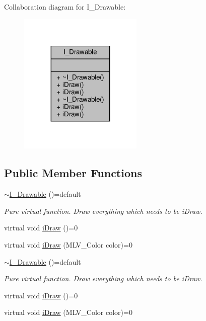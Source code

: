 Collaboration diagram for I\+\_\+\+Drawable\+:\nopagebreak
\begin{figure}[H]
\begin{center}
\leavevmode
\includegraphics[width=167pt]{classI__Drawable__coll__graph}
\end{center}
\end{figure}
\subsection*{Public Member Functions}
\begin{DoxyCompactItemize}
\item 
\hyperlink{classI__Drawable_a80bfc9f76ccdded97cbcf446d4ace774}{$\sim$\+I\+\_\+\+Drawable} ()=default
\begin{DoxyCompactList}\small\item\em Pure virtual function. Draw everything which needs to be i\+Draw. \end{DoxyCompactList}\item 
virtual void \hyperlink{classI__Drawable_ae24c65000977a805f52ce032321cd86f}{i\+Draw} ()=0
\item 
virtual void \hyperlink{classI__Drawable_a25f6474325614c451a91f019e5fe8010}{i\+Draw} (M\+L\+V\+\_\+\+Color color)=0
\item 
\hyperlink{classI__Drawable_a80bfc9f76ccdded97cbcf446d4ace774}{$\sim$\+I\+\_\+\+Drawable} ()=default
\begin{DoxyCompactList}\small\item\em Pure virtual function. Draw everything which needs to be i\+Draw. \end{DoxyCompactList}\item 
virtual void \hyperlink{classI__Drawable_ae24c65000977a805f52ce032321cd86f}{i\+Draw} ()=0
\item 
virtual void \hyperlink{classI__Drawable_a25f6474325614c451a91f019e5fe8010}{i\+Draw} (M\+L\+V\+\_\+\+Color color)=0
\end{DoxyCompactItemize}



